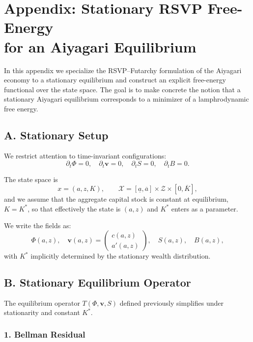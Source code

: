 \documentclass[12pt]{article}
\begin{document}
\section*{Appendix: Stationary RSVP Free-Energy\\
for an Aiyagari Equilibrium}

In this appendix we specialize the RSVP--Futarchy formulation of the
Aiyagari economy to a stationary equilibrium and construct an explicit
free-energy functional over the state space. The goal is to make
concrete the notion that a stationary Aiyagari equilibrium corresponds
to a minimizer of a lamphrodynamic free energy.

\subsection*{A. Stationary Setup}

We restrict attention to time-invariant configurations:
\[
\partial_t \Phi = 0,\quad
\partial_t \mathbf{v} = 0,\quad
\partial_t S = 0,\quad
\partial_t B = 0.
\]

The state space is
\[
x = (a,z,K),\qquad
\mathcal{X} = [\underline{a},\overline{a}] \times \mathcal{Z} \times [0,\overline{K}],
\]
and we assume that the aggregate capital stock is constant at
equilibrium, $K=K^\ast$, so that effectively the state is $(a,z)$ and
$K^\ast$ enters as a parameter.

We write the fields as:
\[
\Phi(a,z),\quad
\mathbf{v}(a,z) = \begin{pmatrix} c(a,z) \\ a'(a,z) \end{pmatrix},\quad
S(a,z),\quad
B(a,z),
\]
with $K^\ast$ implicitly determined by the stationary wealth
distribution.

\subsection*{B. Stationary Equilibrium Operator}

The equilibrium operator $T(\Phi,\mathbf{v},S)$ defined previously
simplifies under stationarity and constant $K^\ast$.

\subsubsection*{1. Bellman Residual}
\end{document}
